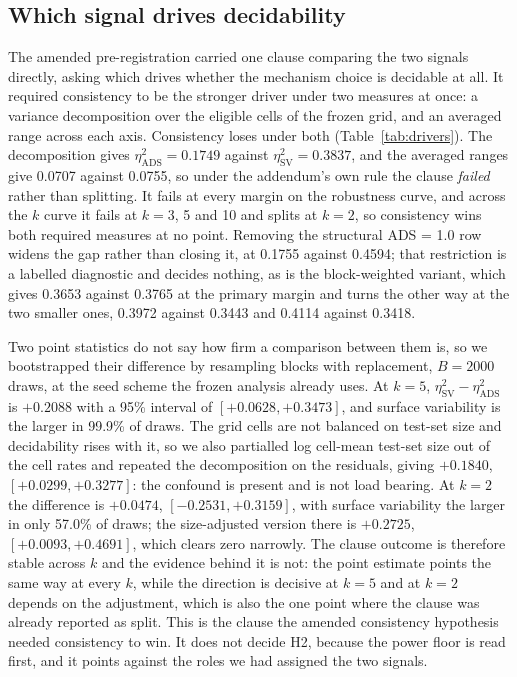 \documentclass[11pt]{article}
\begin{document}
\subsection{Which signal drives decidability}
\label{sec:drivers}

The amended pre-registration carried one clause comparing the two signals
directly, asking which drives whether the mechanism choice is decidable at
all. It required consistency to be the stronger driver under two measures at
once: a variance decomposition over the eligible cells of the frozen grid, and
an averaged range across each axis. Consistency loses under both
(Table~\ref{tab:drivers}). The decomposition gives
$\eta^2_{\mathrm{ADS}} = 0.1749$ against $\eta^2_{\mathrm{SV}} = 0.3837$, and
the averaged ranges give 0.0707 against 0.0755, so under the addendum's own
rule the clause \emph{failed} rather than splitting. It fails at every margin
on the robustness curve, and across the $k$ curve it fails at $k = 3$, 5 and
10 and splits at $k = 2$, so consistency wins both required measures at no
point. Removing the structural ADS = 1.0 row widens the gap rather than
closing it, at 0.1755 against 0.4594; that restriction is a labelled
diagnostic and decides nothing, as is the block-weighted variant, which gives
0.3653 against 0.3765 at the primary margin and turns the other way at the two
smaller ones, 0.3972 against 0.3443 and 0.4114 against 0.3418.

Two point statistics do not say how firm a comparison between them is, so we
bootstrapped their difference by resampling blocks with replacement,
$B = 2000$ draws, at the seed scheme the frozen analysis already uses. At
$k = 5$, $\eta^2_{\mathrm{SV}} - \eta^2_{\mathrm{ADS}}$ is $+0.2088$ with a
95\% interval of $[+0.0628, +0.3473]$, and surface variability is the larger
in 99.9\% of draws.
The grid cells are not balanced on test-set size and decidability rises with
it, so we also partialled log cell-mean test-set size out of the cell rates
and repeated the decomposition on the residuals, giving $+0.1840$,
$[+0.0299, +0.3277]$: the confound is present and is not load bearing. At
$k = 2$ the difference is $+0.0474$, $[-0.2531, +0.3159]$, with surface
variability the larger in only 57.0\% of draws; the size-adjusted version
there is $+0.2725$, $[+0.0093, +0.4691]$, which clears zero narrowly. The
clause outcome is therefore stable across $k$ and the evidence behind it is
not: the point estimate points the same way at every $k$, while the direction
is decisive at $k = 5$ and at $k = 2$ depends on the adjustment, which is also the one
point where the clause was already reported as split. This is the clause the
amended consistency hypothesis needed consistency to win. It does not decide
H2, because the power floor is read first, and it points against the roles we
had assigned the two signals.
\end{document}

